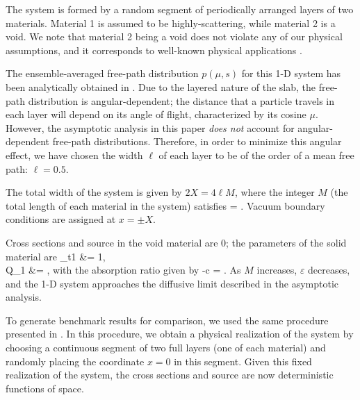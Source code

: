 \documentclass{anstrans}
\def\bala#1\nala{\begin{align*}#1\end{align*}}
\newcommand{\f}{\frac}
\begin{document}
The system is formed by a random segment of periodically arranged layers of two materials.
Material 1 is assumed to be highly-scattering, while material 2 is a void.
We note that material 2 being a void does not violate any of our physical assumptions, and it corresponds to well-known physical applications \cite{larvas11,vaslar14b,davxu14}.

The ensemble-averaged free-path distribution $p(\mu,s)$ for this 1-D system has been analytically obtained in \cite{vas16}.
Due to the layered nature of the slab, the free-path distribution is angular-dependent; the distance that a particle travels in each layer will depend on its angle of flight, characterized by its cosine $\mu$.
However, the asymptotic analysis in this paper \textit{does not} account for angular-dependent free-path distributions.
Therefore, in order to minimize this angular effect, we have chosen the width $\ell$ of each layer to be of the order of a mean free path: $\ell=0.5$. 

The total width of the system is given by $2X = 4\ell M$, where the integer $M$ (the total length of each material in the system) satisfies
\bala
M = \f{1}{\varepsilon}.
\nala
Vacuum boundary conditions are assigned at $x=\pm X$. 

Cross sections and source in the void material are 0; the parameters of the solid material are
\bala
\Sigma_{t1} &= 1,\\
Q_1 &= \f{0.2}{M^2},
\nala
with the absorption ratio given by
\bala
1-c = \f{0.1}{M^2}.
\nala
As $M$ increases, $\varepsilon$ decreases, and the 1-D system approaches the diffusive limit described in the asymptotic analysis.

To generate benchmark results for comparison, we used the same procedure presented in \cite{vas16}.
In this procedure, we obtain a physical realization of the system by choosing a continuous segment of two full layers (one of each material) and randomly placing the coordinate $x = 0$ in this segment.
Given this fixed realization of the system, the cross sections and source are now deterministic functions of space.
\end{document}
